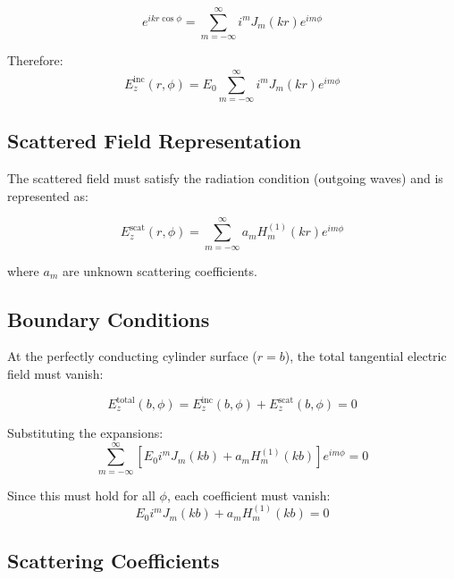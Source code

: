 \documentclass[11pt,a4paper]{article}
\begin{document}
\begin{equation}
e^{ikr\cos\phi} = \sum_{m=-\infty}^{\infty} i^m J_m(kr) e^{im\phi} \label{eq:jacobi_anger}
\end{equation}

Therefore:
\begin{equation}
E_z^{\text{inc}}(r,\phi) = E_0 \sum_{m=-\infty}^{\infty} i^m J_m(kr) e^{im\phi} \label{eq:incident_expansion}
\end{equation}

\subsection{Scattered Field Representation}

The scattered field must satisfy the radiation condition (outgoing waves) and is represented as:

\begin{equation}
E_z^{\text{scat}}(r,\phi) = \sum_{m=-\infty}^{\infty} a_m H_m^{(1)}(kr) e^{im\phi} \label{eq:scattered_expansion}
\end{equation}

where $a_m$ are unknown scattering coefficients.

\subsection{Boundary Conditions}

At the perfectly conducting cylinder surface ($r = b$), the total tangential electric field must vanish:

\begin{equation}
E_z^{\text{total}}(b,\phi) = E_z^{\text{inc}}(b,\phi) + E_z^{\text{scat}}(b,\phi) = 0 \label{eq:boundary_condition}
\end{equation}

Substituting the expansions:
\begin{equation}
\sum_{m=-\infty}^{\infty} \left[E_0 i^m J_m(kb) + a_m H_m^{(1)}(kb)\right] e^{im\phi} = 0 \label{eq:boundary_expanded}
\end{equation}

Since this must hold for all $\phi$, each coefficient must vanish:
\begin{equation}
E_0 i^m J_m(kb) + a_m H_m^{(1)}(kb) = 0 \label{eq:coefficient_equation}
\end{equation}

\subsection{Scattering Coefficients}
\end{document}

